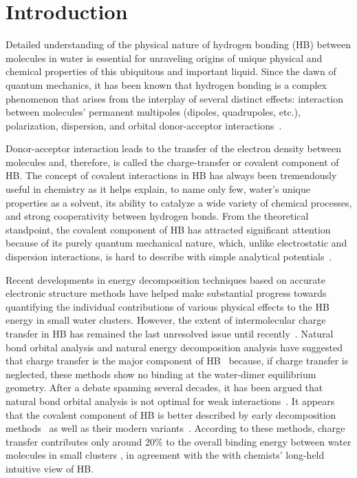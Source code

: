\documentclass[prl,twocolumn,showpacs]{revtex4}
\begin{document}
\section{Introduction} 

Detailed understanding of the physical nature of hydrogen bonding (HB) between molecules in water is essential for unraveling origins of unique physical and chemical properties of this ubiquitous and important liquid. Since the dawn of quantum mechanics, it has been known that hydrogen bonding is a complex phenomenon that arises from the interplay of several distinct effects: interaction between molecules’ permanent multipoles (dipoles, quadrupoles, etc.), polarization, dispersion, and orbital donor-acceptor interactions~\cite{ZZZ}. 

Donor-acceptor interaction leads to the transfer of the electron density between molecules and, therefore, is called the charge-transfer or covalent component of HB. The concept of covalent interactions in HB has always been tremendously useful in chemistry 
as it helps explain, to name only few, water's unique properties as a solvent, its ability to catalyze a wide variety of chemical processes, and strong cooperativity between hydrogen bonds. From the theoretical standpoint, the covalent component of HB has attracted significant attention because of its purely quantum mechanical nature, which, unlike electrostatic and dispersion interactions, is hard to describe with simple analytical potentials~\cite{ZZZ}. 


Recent developments in energy decomposition techniques based on accurate electronic structure methods have helped make substantial progress towards quantifying the individual contributions of various physical effects to the HB energy in small water clusters. However, the extent of intermolecular charge transfer in HB has remained the last unresolved issue until recently~\cite{isaacs1999covalency,ghanty2000hydrogen,stone2017natural}. Natural bond orbital analysis\cite{weinhold1998natural} and natural energy decomposition analysis \cite{glendening1994natural} have suggested that charge transfer is the major component of HB~\cite{schenter1996natural,glendening2005natural,weinhold2005resonance} because, if charge transfer is neglected, these methods show no binding at the water-dimer equilibrium geometry. After a debate spanning several decades, it has been argued that natural bond orbital analysis is not optimal for weak interactions~\cite{stone2017natural}. It appears that the covalent component of HB is better described by early decomposition methods~\cite{kitaura1976new,bagus1984new,bagus1992decomposition,stevens1987frozen,chen1996energy,ZZZ-SAPT} as well as their modern variants~\cite{mo2000energy,misquitta2003dispersion,khaliullin2007unravelling}. According to these methods, charge transfer contributes only around 20\% to the overall binding energy between water molecules in small clusters \cite{stevens1987frozen,chen1996energy,piquemal2005csov,khaliullin2009electron,cobar2012examination}, in agreement with the with chemists' long-held intuitive view of HB.
\end{document}
